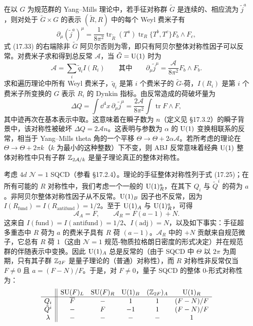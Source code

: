 在以 $G$ 为规范群的 Yang--Mills 理论中，若手征对称群 $\tilde G$ 是连续的、相应流为 $\tilde j^a$，则对处于 $\tilde G\times G$ 的表示 $(\tilde R,R)$ 中的每个 Weyl 费米子有
\begin{equation}
\partial_\mu(\tilde j^a)^\mu=\frac{1}{8\pi^2}\operatorname{tr}_{\tilde R}(T^a)\operatorname{tr}_R\{T^b,T^c\}F_b\wedge F_c,
\tag{17.33}
\end{equation}
式 (17.33) 的右端除非 $\tilde G$ 阿贝尔否则为零，即只有阿贝尔整体对称性因子可以反常。对费米子求和得到总反常 $\mathcal{A}$，当 $\tilde G=\operatorname{U}(1)$ 时为
\begin{equation}
\mathcal{A}=\sum_i\tilde q_i I(R_i)\qquad\text{其中}\qquad \partial_\mu\tilde j^\mu=\frac{\mathcal{A}}{8\pi^2}F_b\wedge F_b.
\tag{17.34}
\end{equation}
求和遍历理论中所有 Weyl 费米子，$\tilde q_i$ 是第 $i$ 个费米子的 $\tilde G$-荷，$I(R_i)$ 是第 $i$ 个费米子所变换的 $G$ 表示 $R_i$ 的 Dynkin 指标。由反常造成的荷破坏量为
\begin{equation}
\Delta Q=\int\dd^4x\,\partial_\mu\tilde j^\mu=\frac{2\mathcal{A}}{8\pi^2}\int\operatorname{tr}F\wedge F,
\tag{17.35}
\end{equation}
其中迹再次在基本表示中取。这意味着在瞬子数为 $n$（定义见 §17.3.2）的瞬子背景中，该对称性被破坏 $\Delta Q=2\mathcal{A}n$。这表明与参数为 $\alpha$ 的 $\operatorname{U}(1)$ 变换相联系的反常，相当于 Yang--Mills theta 角的一个平移 $\Theta\to\Theta+2\alpha\mathcal{A}$。若所考虑的理论在 $\Theta\to\Theta+2\pi k$（$k$ 为最小的这种整数）下不变，则 ABJ 反常意味着经典 $\operatorname{U}(1)$ 整体对称性中只有子群 $\mathbb{Z}_{2\mathcal{A}/k}$ 是量子理论真正的整体对称性。

\begin{example}[17.35]
考虑 $4d$ $\mathcal{N}=1$ SQCD（参看 §17.2.4）。理论的手征整体对称性列于式 (17.25)；在所有可能的 $R$ 对称性中，我们考虑一个一般的 $\operatorname{U}(1)^a_R$，在其下 $Q_i$ 与 $\tilde Q^i$ 的荷为 $a$。非阿贝尔整体对称性因子从不反常。$\operatorname{U}(1)_B$ 因子也不反常，因为 $I(R_{\text{fund}})=I(R_{\text{antifund}})=1/2$。至于 $\operatorname{U}(1)_A$ 与 $\operatorname{U}(1)^a_R$，可得
\[
\mathcal{A}_A=F,\qquad \mathcal{A}_R=F(a-1)+N.
\]
这来自 $I(\text{fund})=I(\text{antifund})=1/2$、$I(\text{adj})=N$，以及如下事实：手征超多重态中 $R$ 荷为 $a$ 的费米子具有 $R$ 荷 $(a-1)$。$\mathcal{A}_R$ 中的 $+N$ 贡献来自规范微子，它总有 $R$ 荷 $1$（这由 $\mathcal{N}=1$ 规范-物质拉格朗日密度的形式决定）并在规范群的伴随表示中变换。因此 $\operatorname{U}(1)_A$ 总是反常的（由于 SQCD 中 $\Theta$ 以 $2\pi$ 为周期，只有其子群 $\mathbb{Z}_{2F}$ 是量子理论的（普通）对称性），而 $R$ 对称性非反常仅当 $F\ne0$ 且 $a=(F-N)/F$。于是，对 $F\ne0$，量子 SQCD 的整体 0-形式对称性为：
\begin{equation*}
\begin{array}{c||ccccc}
 & \operatorname{SU}(F)_L & \operatorname{SU}(F)_R & \operatorname{U}(1)_B & (\mathbb{Z}_{2F})_A & \operatorname{U}(1)_R\\ \hline
Q_i & \overline F & - & 1 & 1 & (F-N)/F\\
\tilde Q^i & - & F & -1 & 1 & (F-N)/F\\
\lambda & - & - & - & - & 1
\end{array}
\end{equation*}
\end{example}

